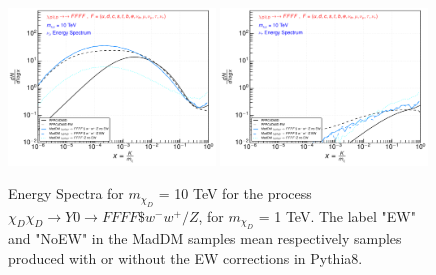 \documentclass[epj,nopacs,fleqn]{svjour}
\begin{document}
\begin{figure}[!b]
\subfigure
{ \includegraphics[width=0.49\textwidth]{Fig/xdxd_FFFF_WZ/10_neutrinos_mu_FFFF_10.pdf}}
\subfigure
{ \includegraphics[width=0.49\textwidth]{Fig/xdxd_FFFF_WZ/10_neutrinos_tau_FFFF_10.pdf}}
\caption{Energy Spectra for $m_{\chi_D}$ = 10 TeV for the process $\chi_D \chi_D \rightarrow Y0 \rightarrow FFFF \$w^- w^+ /Z $, for $m_{\chi_D}$ = 1 TeV. The label "EW" and "NoEW" in the MadDM samples mean respectively samples produced with or without the EW corrections in Pythia8.}
\label{woff_10}
\end{figure}

\clearpage
\end{document}
